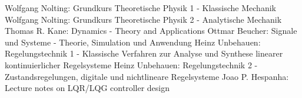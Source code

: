 \documentclass{article}
\begin{document}
\tableofcontents
\newpage












\newpage
\begin{thebibliography}{\hspace{0.5cm}}
	 Wolfgang Nolting: Grundkurs Theoretische Physik 1 - Klassische Mechanik
	 Wolfgang Nolting: Grundkurs Theoretische Physik 2 - Analytische Mechanik
	 Thomas R. Kane: Dynamics - Theory and Applications
	 Ottmar Beucher: Signale und Systeme - Theorie, Simulation und Anwendung
	 Heinz Unbehauen: Regelungstechnik 1 - Klassische Verfahren zur Analyse und Synthese linearer kontinuierlicher Regelsysteme
	 Heinz Unbehauen: Regelungstechnik 2 - Zustandsregelungen, digitale und nichtlineare Regelsysteme
	 Joao P. Hespanha: Lecture notes on LQR/LQG controller design
\end{thebibliography}
\end{document}
